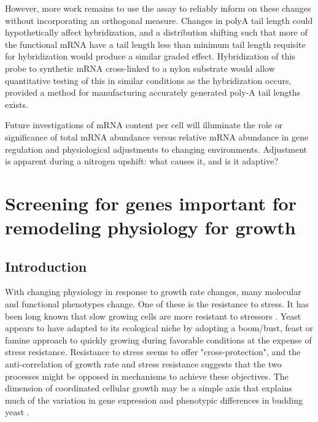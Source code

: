 However, more work remains to use the assay to reliably inform on
these changes without incorporating an orthogonal measure.
Changes in polyA tail length could hypothetically affect
hybridization, and a distribution shifting such that more of the
functional mRNA have a tail length less than minimum tail length
requisite for hybridization would produce a similar graded effect.
Hybridization of this probe to synthetic mRNA cross-linked to a nylon
substrate would allow quantitative testing of this in similar
conditions as the hybridization occurs, provided a method for
manufacturing accurately generated poly-A tail lengths exists.

Future investigations of mRNA content per cell will illuminate
the role or significance of total mRNA abundance 
versus relative mRNA abundance in gene regulation and physiological
adjustments to changing environments. Adjustment is apparent during a 
nitrogen upshift: what causes it, and is it adaptive?

\section{Screening for genes important for remodeling physiology for
growth}

\subsection{Introduction}



With changing physiology in response to growth rate changes, many
molecular and functional phenotypes change. One of these is the
resistance to stress. 
It has been long known that slow growing cells are more resistant to
stressors
\parencite{sherman1923physiological,elliott1993stress,lu2009slow}.
Yeast appears to have adapted to its ecological niche by adopting a
boom/bust, feast or famine approach to quickly
growing during favorable conditions at the expense of stress
resistance. 
Resistance to stress seems to offer "cross-protection", and the
anti-correlation of growth rate and stress resistance suggests that
the two processes might be opposed in mechanisms to
achieve these objectives.
The dimension of coordinated cellular growth may be a simple axis that
explains much of the variation in gene expression and phenotypic
differences in budding yeast
\parencite{brauer2008coordination,lu2009slow}.

